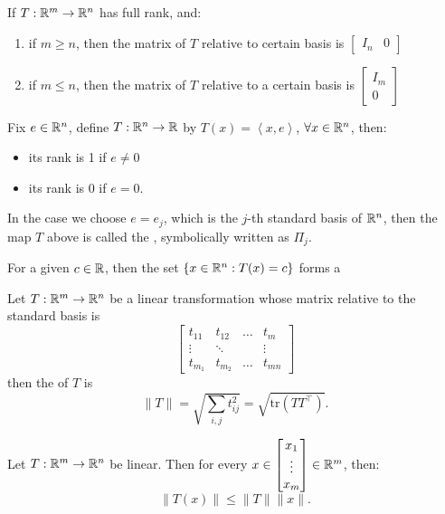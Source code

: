 \documentclass[../main/main.tex]{subfiles}
\begin{document}
\begin{lemma}
   If $T: \mathbb{R}^{m}\to  \mathbb{R}^{n}$ has full rank, and: 
   \begin{enumerate}
       \item if $m\ge n$, then the matrix of $T$ relative to certain basis is $ \begin{bmatrix} I_n & 0 \end{bmatrix} $
       \item if $m \le  n$, then the matrix of $T$ relative to a certain basis is  $ \begin{bmatrix} I_m \\ 0 \end{bmatrix} $
   \end{enumerate}
\end{lemma}
\begin{example}
    Fix $e\in \mathbb{R}^{n}$, define $T: \mathbb{R}^{n}\to \mathbb{R} $ by $T(x) = \left<x,e\right>$, $ \forall x\in \mathbb{R}^{n}$, then: 
    \begin{itemize}
        \item its rank is 1 if $e\neq 0$
        \item its rank is 0 if $e = 0$.
    \end{itemize}
\end{example}
\begin{definition} 
    In the case we choose $e = e_j$, which is the $j$-th standard basis of  $ \mathbb{R}^{n}$, then the map $T$ above is called the , symbolically written as $\Pi_j$. 
\end{definition}
\begin{definition}
    For a given $c\in \mathbb{R}$, then the set $ \{x\in \mathbb{R}^{n}: T(x) = c\} $ forms a 
\end{definition}
\begin{definition}
   Let $T: \mathbb{R}^{m}\to  \mathbb{R}^{n}$ be a linear transformation   whose matrix relative to the standard basis is
   \[
       \begin{bmatrix} t_{11} & t_{12} & \ldots & t_m\\
       \vdots & \ddots & & \vdots \\
   t_{m_1} & t_{m_2} & \ldots & t_{mn}\end{bmatrix} 
   \] then the  of $T$ is  \[
   \|T\| = \sqrt{\sum_{i,j} t_{ij}^2} = \sqrt{\text{tr}(TT^{\top})} 
   .\]  
\end{definition}
\begin{theorem}
   Let $T: \mathbb{R}^{m} \to  \mathbb{R}^{n}$ be linear. Then for every $x\in \begin{bmatrix} x_1\\ \vdots\\x_m \end{bmatrix} \in  \mathbb{R}^{m}$, then:  
   \[
       \|T(x)\|\le \|T\|\|x\|
   .\] 
\end{theorem}
\end{document}
